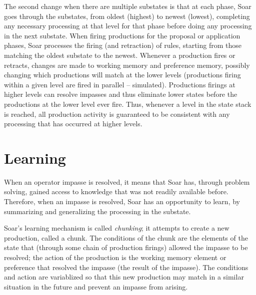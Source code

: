 The second change when there are multiple substates is that at each
phase, Soar goes through the substates, from oldest (highest) to newest
(lowest), completing any necessary processing at that level for that
phase before doing any processing in the next substate.  When firing
productions for the proposal or application phases, Soar processes the
firing (and retraction) of rules, starting from those matching the
oldest substate to the newest.  Whenever a production fires or retracts,
changes are made to working memory and preference memory, possibly
changing which productions will match at the lower levels (productions
firing within a given level are fired in parallel -- simulated).
Productions firings at higher levels can resolve impasses and thus
eliminate lower states before the productions at the lower level ever
fire.  Thus, whenever a level in the state stack is reached, all
production activity is guaranteed to be consistent with any processing
that has occurred at higher levels.


\section{Learning}
\label{ARCH-learning} 

When an operator impasse is resolved, it means that Soar has, through problem 
solving,
gained access to knowledge that was not readily available before. Therefore,
when an impasse is resolved, Soar has an opportunity to learn, by summarizing
and generalizing the processing in the substate.

Soar's learning mechanism is called \textit{chunking}; it attempts to create a
new production, called a chunk. The conditions of the chunk are the elements
of the state that (through some chain of production firings) allowed the
impasse to be resolved; the action of the production is the working
memory element or preference that
resolved the impasse (the result of the impasse). The conditions and action
are variablized so that this new production may match in a similar situation
in the future and prevent an impasse from arising. 

